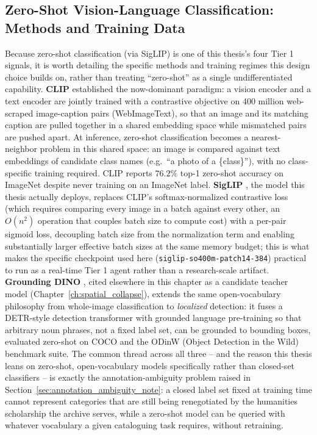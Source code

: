 \documentclass[12pt,a4paper]{report}
\begin{document}
\subsection{Zero-Shot Vision-Language Classification: Methods and Training Data}
Because zero-shot classification (via SigLIP) is one of this thesis's four Tier 1 signals, it is worth detailing the specific methods and training regimes this design choice builds on, rather than treating ``zero-shot'' as a single undifferentiated capability. \textbf{CLIP} \cite{clip2021} established the now-dominant paradigm: a vision encoder and a text encoder are jointly trained with a contrastive objective on 400 million web-scraped image-caption pairs (WebImageText), so that an image and its matching caption are pulled together in a shared embedding space while mismatched pairs are pushed apart. At inference, zero-shot classification becomes a nearest-neighbor problem in this shared space: an image is compared against text embeddings of candidate class names (e.g.\ ``a photo of a \{class\}''), with no class-specific training required. CLIP reports $76.2\%$ top-1 zero-shot accuracy on ImageNet despite never training on an ImageNet label. \textbf{SigLIP} \cite{siglip2023}, the model this thesis actually deploys, replaces CLIP's softmax-normalized contrastive loss (which requires comparing every image in a batch against every other, an $O(n^2)$ operation that couples batch size to compute cost) with a per-pair sigmoid loss, decoupling batch size from the normalization term and enabling substantially larger effective batch sizes at the same memory budget; this is what makes the specific checkpoint used here (\texttt{siglip-so400m-patch14-384}) practical to run as a real-time Tier 1 agent rather than a research-scale artifact. \textbf{Grounding DINO} \cite{groundingdino2023}, cited elsewhere in this chapter as a candidate teacher model (Chapter~\ref{ch:spatial_collapse}), extends the same open-vocabulary philosophy from whole-image classification to \emph{localized} detection: it fuses a DETR-style detection transformer with grounded language pre-training so that arbitrary noun phrases, not a fixed label set, can be grounded to bounding boxes, evaluated zero-shot on COCO and the ODinW (Object Detection in the Wild) benchmark suite. The common thread across all three -- and the reason this thesis leans on zero-shot, open-vocabulary models specifically rather than closed-set classifiers -- is exactly the annotation-ambiguity problem raised in Section~\ref{sec:annotation_ambiguity_note}: a closed label set fixed at training time cannot represent categories that are still being renegotiated by the humanities scholarship the archive serves, while a zero-shot model can be queried with whatever vocabulary a given cataloguing task requires, without retraining.
\end{document}
